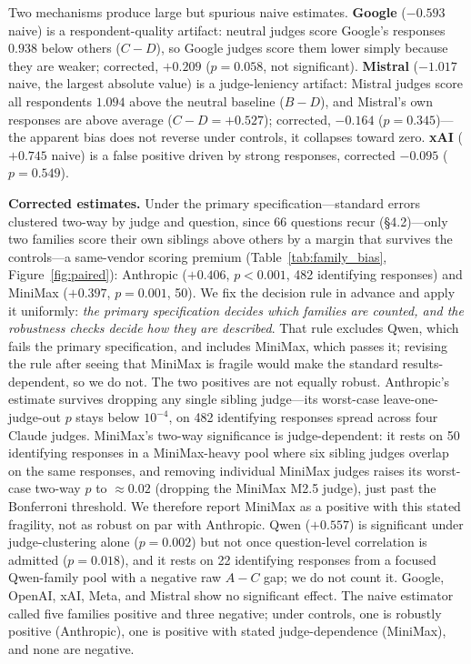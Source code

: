 \documentclass{article}
\begin{document}
Two mechanisms produce large but spurious naive estimates. \textbf{Google} ($-0.593$ naive) is a respondent-quality artifact: neutral judges score Google's responses $0.938$ below others ($C - D$), so Google judges score them lower simply because they are weaker; corrected, $+0.209$ ($p = 0.058$, not significant). \textbf{Mistral} ($-1.017$ naive, the largest absolute value) is a judge-leniency artifact: Mistral judges score all respondents $1.094$ above the neutral baseline ($B - D$), and Mistral's own responses are above average ($C - D = +0.527$); corrected, $-0.164$ ($p = 0.345$)---the apparent bias does not reverse under controls, it collapses toward zero. \textbf{xAI} ($+0.745$ naive) is a false positive driven by strong responses, corrected $-0.095$ ($p = 0.549$).

\textbf{Corrected estimates.} Under the primary specification---standard errors clustered two-way by judge and question, since 66 questions recur (\S4.2)---only two families score their own siblings above others by a margin that survives the controls---a same-vendor scoring premium (Table~\ref{tab:family_bias}, Figure~\ref{fig:paired}): Anthropic ($+0.406$, $p < 0.001$, 482 identifying responses) and MiniMax ($+0.397$, $p = 0.001$, 50). We fix the decision rule in advance and apply it uniformly: \emph{the primary specification decides which families are counted, and the robustness checks decide how they are described}. That rule excludes Qwen, which fails the primary specification, and includes MiniMax, which passes it; revising the rule after seeing that MiniMax is fragile would make the standard results-dependent, so we do not. The two positives are not equally robust. Anthropic's estimate survives dropping any single sibling judge---its worst-case leave-one-judge-out $p$ stays below $10^{-4}$, on 482 identifying responses spread across four Claude judges. MiniMax's two-way significance is judge-dependent: it rests on 50 identifying responses in a MiniMax-heavy pool where six sibling judges overlap on the same responses, and removing individual MiniMax judges raises its worst-case two-way $p$ to $\approx 0.02$ (dropping the MiniMax M2.5 judge), just past the Bonferroni threshold. We therefore report MiniMax as a positive with this stated fragility, not as robust on par with Anthropic. Qwen ($+0.557$) is significant under judge-clustering alone ($p = 0.002$) but not once question-level correlation is admitted ($p = 0.018$), and it rests on 22 identifying responses from a focused Qwen-family pool with a negative raw $A-C$ gap; we do not count it. Google, OpenAI, xAI, Meta, and Mistral show no significant effect. The naive estimator called five families positive and three negative; under controls, one is robustly positive (Anthropic), one is positive with stated judge-dependence (MiniMax), and none are negative.
\end{document}
